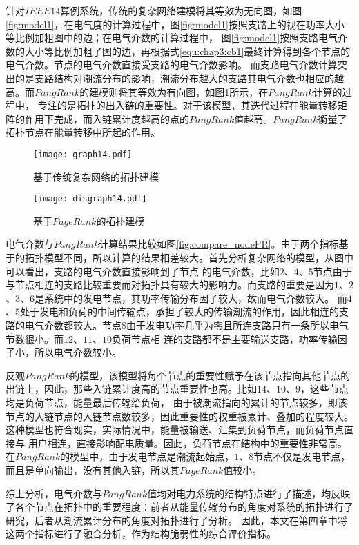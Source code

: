 针对$IEEE14$算例系统，传统的复杂网络建模将其等效为无向图，如图\ref{fig:model1}，在电气度的计算过程中，图\ref{fig:model1}按照支路上的视在功率大小等比例加粗图中的边；在电气介数的计算过程中，
图\ref{fig:model1}按照支路电气介数的大小等比例加粗了图的边，再根据式\ref{equ:chap3:cb1}最终计算得到各个节点的电气介数。节点的电气介数直接受支路的电气介数影响。
而支路电气介数计算突出的是支路结构对潮流分布的影响，潮流分布越大的支路其电气介数也相应的越高。而$PangRank$的建模则将其等效为有向图，如图\ref{fig:model2}所示，在$PangRank$计算的过程中，
专注的是拓扑的出入链的重要性。对于该模型，其迭代过程在能量转移矩阵的作用下完成，而入链累计度越高的点的$PangRank$值越高。$PangRank$衡量了拓扑节点在能量转移中所起的作用。
\begin{figure}[H]
\begin{minipage}{0.48\textwidth}
  \centering
  \texttt{[image: graph14.pdf]}
  \caption{基于传统复杂网络的拓扑建模}
  \label{fig:model1}
\end{minipage}\hfill
\begin{minipage}{0.48\textwidth}
  \centering
  \texttt{[image: disgraph14.pdf]}
  \caption{基于$PageRank$的拓扑建模}
  \label{fig:model2}
\end{minipage}
\end{figure}
电气介数与$PangRank$计算结果比较如图\ref{fig:compare_nodePR}。由于两个指标基于的拓扑模型不同，所以计算的结果相差较大。首先分析复杂网络的模型，从图中可以看出，支路的电气介数直接影响到了节点
的电气介数，比如$2$、$4$、$5$节点由于与节点相连的支路比较重要而对拓扑具有较大的影响力。而支路的重要是因为$1$、$2$、$3$、$6$是系统中的发电节点，其功率传输分布因子较大，故而电气介数较大。
而$4$、$5$处于发电和负荷的中间传输点，承担了较大的传输潮流的作用，因此相连的支路的电气介数都较大。节点$8$由于发电功率几乎为零且所连支路只有一条所以电气节数很小。而$12$、$11$、$10$负荷节点相
连的支路都不是主要输送支路，功率传输因子小，所以电气介数较小。

反观$PangRank$的模型，该模型将每个节点的重要性赋予在该节点指向其他节点的出链上，因此，那些入链累计度高的节点重要性也高。比如$14$、$10$、$9$，这些节点均是负荷节点，能量最后传输给负荷，
由于被潮流指向的累计的节点较多，即该节点的入链节点的入链节点数较多，因此重要性的权重被累计、叠加的程度较大。这种模型也符合现实，实际情况中，能量被输送、汇集到负荷节点，而负荷节点直接与
用户相连，直接影响配电质量。因此，负荷节点在结构中的重要性非常高。在$PangRank$的模型中，由于发电节点是潮流起始点，$1$、$8$节点不仅是发电节点，而且是单向输出，没有其他入链，所以其$PageRank$值较小。

综上分析，电气介数与$PangRank$值均对电力系统的结构特点进行了描述，均反映了各个节点在拓扑中的重要程度：前者从能量传输分布的角度对系统的拓扑进行了研究，后者从潮流累计分布的角度对拓扑进行了分析。
因此，本文在第四章中将这两个指标进行了融合分析，作为结构脆弱性的综合评价指标。

